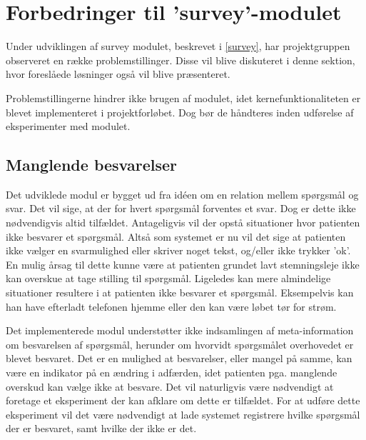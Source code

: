 \label{refleksion}


\section{Forbedringer til 'survey'-modulet}
Under udviklingen af survey modulet, beskrevet i \cref{survey}, har projektgruppen observeret en række problemstillinger.
Disse vil blive diskuteret i denne sektion, hvor foreslåede løsninger også vil blive præsenteret.

Problemstillingerne hindrer ikke brugen af modulet, idet kernefunktionaliteten er blevet implementeret i projektforløbet.
Dog bør de håndteres inden udførelse af eksperimenter med modulet.

\subsection{Manglende besvarelser}\label{reflection:manglende}
Det udviklede modul er bygget ud fra idéen om en relation mellem spørgsmål og svar.
Det vil sige, at der for hvert spørgsmål forventes et svar.
Dog er dette ikke nødvendigvis altid tilfældet.
Antageligvis vil der opstå situationer hvor patienten ikke besvarer et spørgsmål.
Altså som systemet er nu vil det sige at patienten ikke vælger en svarmulighed eller skriver noget tekst, og/eller ikke trykker 'ok'.
En mulig årsag til dette kunne være at patienten grundet lavt stemningsleje ikke kan overskue at tage stilling til spørgsmål.
Ligeledes kan mere almindelige situationer resultere i at patienten ikke besvarer et spørgsmål.
Eksempelvis kan han have efterladt telefonen hjemme eller den kan være løbet tør for strøm.

Det implementerede modul understøtter ikke indsamlingen af meta-information om besvarelsen af spørgsmål, herunder om hvorvidt spørgsmålet overhovedet er blevet besvaret.
Det er en mulighed at besvarelser, eller mangel på samme, kan være en indikator på en ændring i adfærden, idet patienten pga. manglende overskud kan vælge ikke at besvare.
Det vil naturligvis være nødvendigt at foretage et eksperiment der kan afklare om dette er tilfældet.
For at udføre dette eksperiment vil det være nødvendigt at lade systemet registrere hvilke spørgsmål der er besvaret, samt hvilke der ikke er det.


